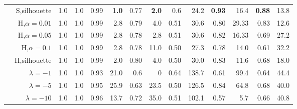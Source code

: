 \begin{table*}
\begin{center}
{\begin{tabular}[th]{@{}lrrrrrrrrrrrrr@{}}
                                                                                    & S,silhouette      & 1.0  & 1.0        & 0.99 & \textbf{1.0}        & 0.77 & \textbf{2.0}          & 0.6  & 24.2                & \textbf{0.93} & 16.4       & \textbf{0.88} & 13.8\\

                                                                                    & H,$\alpha=0.01$   & 1.0  & 1.0        & 0.99 & 2.8                 & 0.79 & 4.0                   & 0.51 & 30.6                & 0.80 & 29.33      & 0.83 & 12.6 \\

                                                                                    & H,$\alpha=0.05$   & 1.0  & 1.0        & 0.99 & 2.8                 & 0.78 & 2.8                   & 0.51 & 30.6                & 0.82 & 16.33      & 0.69 & 27.2 \\

                                                                                    & H,$\alpha=0.1$    & 1.0  & 1.0        & 0.99 & 2.8                 & 0.78 & 11.0                  & 0.50 & 27.3                & 0.78 & 14.0       & 0.61 & 32.2   \\

                                                                                    & H,silhouette      & 1.0  & 1.0        & 0.99 & 2.0                 & 0.80 & 4.0                   & 0.50 & 30.0                & 0.83 & 11.6       & 0.68 & 18.0  \\
                \midrule
        \parbox[t]{2mm}{}    & $\lambda=-1$      & 1.0  & 1.0       & 0.93 & 21.0        & 0.6  & 0          & 0.64 & 138.7      &  0.61 & 99.4        &0.64 & 44.4 \\

                                                                                    & $\lambda=-5$      & 1.0  & 1.0       & 0.95 & 25.9        & 0.63  & 23.5      & 0.50 & 126.5        & 0.84 & 64.8       &0.68 & 40.0 \\

                                                                                    & $\lambda=-10$     & 1.0  & 1.0       & 0.96 & 13.7        & 0.72  & 35.0      & 0.51 & 102.1        & 0.57 & 5.7         &0.66 & 40.8 \\
                \bottomrule



        \end{tabular}
        }
        \label{tab:Results}
    \end{center}
\end{table*}


